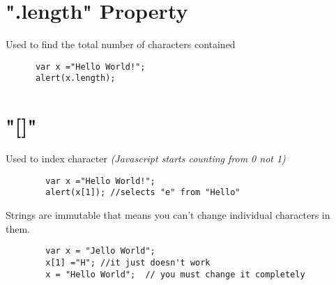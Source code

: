 \documentclass{article}
\begin{document}
  \section{".length" Property}
    Used to find the total number of characters contained
    \begin{lstlisting}
      var x ="Hello World!";
      alert(x.length);
    \end{lstlisting}
  \section{"[]"}
    Used to index character \emph{(Javascript starts counting from 0 not 1)}
      \begin{lstlisting}
        var x ="Hello World!";
        alert(x[1]); //selects "e" from "Hello"
      \end{lstlisting}
    Strings are immutable that means you can't change individual characters in them.
      \begin{lstlisting}
        var x = "Jello World";
        x[1] ="H"; //it just doesn't work
        x = "Hello World";  // you must change it completely
      \end{lstlisting}
\end{document}
